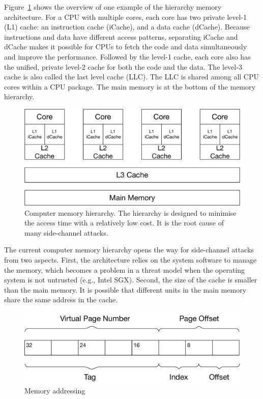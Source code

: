 Figure~\ref{fig:memory_hierarchy} shows the overview of one example of the hierarchy memory architecture. For a CPU with multiple cores, each core has two private level-1 (L1) cache: an instruction cache (iCache), and a data cache (dCache). Because instructions and data have different access patterns, separating iCache and dCache makes it possible for CPUs to fetch the code and data simultaneously and improve the performance. Followed by the level-1 cache, each core also has the unified, private level-2 cache for both the code and the data. The level-3 cache is also called the last level cache (LLC). The LLC is shared among all CPU cores within a CPU package.
The main memory is at the bottom of the memory hierarchy.
\begin{figure}[ht]
  \centering
  \includegraphics[width=.65\columnwidth]{./figures/chapter3/architecture.pdf}
  \caption{Computer memory hierarchy. The hierarchy is designed to minimise the access time with a relatively low cost. It is the root cause of many side-channel attacks.}\label{fig:memory_hierarchy}
\end{figure}

The current computer memory hierarchy opens the way for side-channel attacks from two aspects. First, the architecture relies on the system software to manage the memory, which becomes a problem in a threat model when the operating system is not untrusted (e.g., Intel SGX). Second, the size of the cache is smaller than the main memory. It is possible that different units in the main memory share the same address in the cache.
\begin{figure}[ht]
  \centering
  \includegraphics[width=.65\columnwidth]{./figures/chapter3/address.pdf}
  \caption{Memory addressing}\label{fig:memory_address}
\end{figure}

